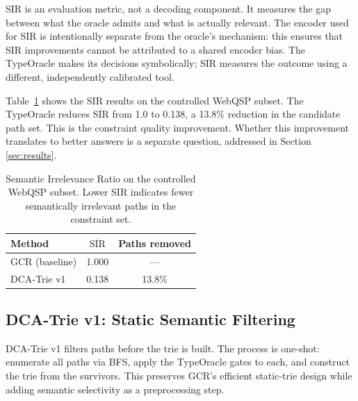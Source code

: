 SIR is an evaluation metric, not a decoding component. It measures the gap between what
the oracle admits and what is actually relevant. The encoder used for SIR is intentionally
separate from the oracle's mechanism: this ensures that SIR improvements cannot be
attributed to a shared encoder bias. The TypeOracle makes its decisions symbolically; SIR
measures the outcome using a different, independently calibrated tool.

Table~\ref{tab:sir_result} shows the SIR results on the controlled WebQSP subset. The
TypeOracle reduces $\overline{\text{SIR}}$ from 1.0 to 0.138, a 13.8\% reduction in
the candidate path set. This is the constraint quality improvement. Whether this
improvement translates to better answers is a separate question, addressed in Section
\ref{sec:results}.

\begin{table}[htpb]
  \centering
  \caption{Semantic Irrelevance Ratio on the controlled WebQSP subset. Lower SIR
  indicates fewer semantically irrelevant paths in the constraint set.}
  \label{tab:sir_result}
  \begin{tabular}{@{}lcc@{}}
    \toprule
    Method           & $\overline{\text{SIR}}$ & Paths removed \\
    \midrule
    GCR (baseline)   & 1.000                    & ---           \\
    DCA-Trie v1      & 0.138                    & 13.8\%        \\
    \bottomrule
  \end{tabular}
\end{table}

\subsection{DCA-Trie v1: Static Semantic Filtering}
\label{sec:method:v1}

DCA-Trie v1 filters paths before the trie is built. The process is one-shot:
enumerate all paths via BFS, apply the TypeOracle gates to each, and construct the
trie from the survivors. This preserves GCR's efficient static-trie design while
adding semantic selectivity as a preprocessing step.

